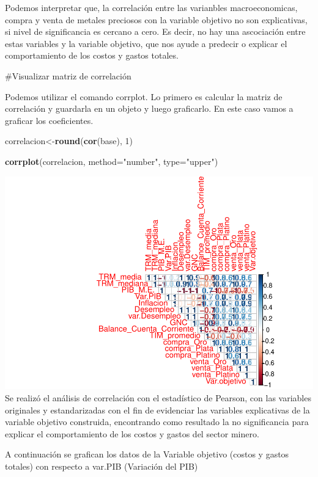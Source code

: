 \documentclass[
  11pt,
  a4paper,
]{book}
\newenvironment{Shaded}{\begin{snugshade}}{\end{snugshade}}
\newcommand{\DataTypeTok}[1]{\textcolor[rgb]{0.13,0.29,0.53}{#1}}
\newcommand{\DecValTok}[1]{\textcolor[rgb]{0.00,0.00,0.81}{#1}}
\newcommand{\KeywordTok}[1]{\textcolor[rgb]{0.13,0.29,0.53}{\textbf{#1}}}
\newcommand{\NormalTok}[1]{#1}
\newcommand{\StringTok}[1]{\textcolor[rgb]{0.31,0.60,0.02}{#1}}
\begin{document}
Podemos interpretar que, la correlación entre las varianbles
macroeconomicas, compra y venta de metales preciosos con la variable
objetivo no son explicativas, si nivel de significancia es cercano a
cero. Es decir, no hay una ascociación entre estas variables y la
variable objetivo, que nos ayude a predecir o explicar el comportamiento
de los costos y gastos totales.

\#Visualizar matriz de correlación

Podemos utilizar el comando corrplot. Lo primero es calcular la matriz
de correlación y guardarla en un objeto y luego graficarlo. En este caso
vamos a graficar los coeficientes.

\begin{Shaded}
\begin{Highlighting}[]
\NormalTok{correlacion<-}\KeywordTok{round}\NormalTok{(}\KeywordTok{cor}\NormalTok{(base), }\DecValTok{1}\NormalTok{)}

\KeywordTok{corrplot}\NormalTok{(correlacion, }\DataTypeTok{method=}\StringTok{"number"}\NormalTok{, }\DataTypeTok{type=}\StringTok{"upper"}\NormalTok{)}
\end{Highlighting}
\end{Shaded}

\includegraphics{index_files/figure-latex/unnamed-chunk-60-1.pdf} Se
realizó el análisis de correlación con el estadístico de Pearson, con
las variables originales y estandarizadas con el fin de evidenciar las
variables explicativas de la variable objetivo construida, encontrando
como resultado la no significancia para explicar el comportamiento de
los costos y gastos del sector minero.

A continuación se grafican los datos de la Variable objetivo (costos y
gastos totales) con respecto a var.PIB (Variación del PIB)
\end{document}
